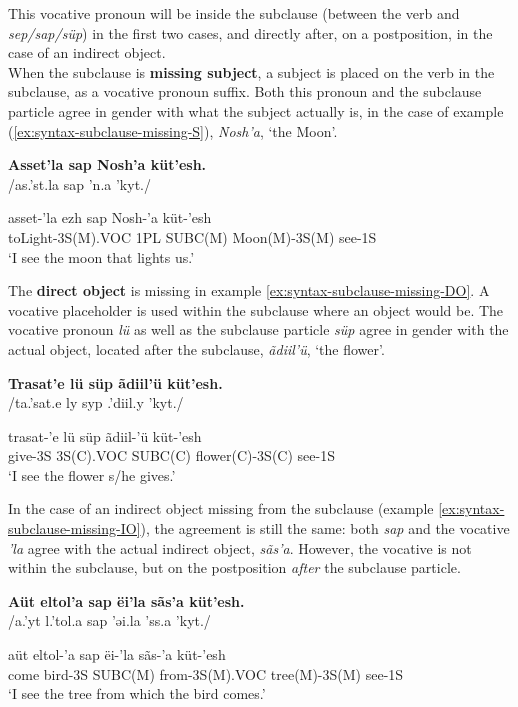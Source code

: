 This vocative pronoun will be inside the subclause (between the verb and \emph{sep/sap/süp}) in the first two cases, and directly after, on a postposition, in the case of an indirect object.\\

When the subclause is \textbf{missing subject}, a subject is placed on the verb in the subclause, as a vocative pronoun suffix.
Both this pronoun and the subclause particle agree in gender with what the subject actually is, in the case of example (\ref{ex:syntax-subclause-missing-S}),
\emph{Nosh’a}, ‘the Moon’.

\begin{exe}
\ex\label{ex:syntax-subclause-missing-S}
\textbf{Asset’la sap Nosh’a küt’esh.}\\
/as.'s{\ipaE}t.la sap 'n{\ipaO\ipaS}.a 'kyt.{\ipaE\ipaS}/

\gll asset-’la ezh sap Nosh-’a küt-’esh\\
toLight-3S(M).VOC 1PL SUBC(M) Moon(M)-3S(M) see-1S\\
\trans ‘I see the moon that lights us.’
\end{exe}

The \textbf{direct object} is missing in example \ref{ex:syntax-subclause-missing-DO}. A vocative placeholder is used within the subclause where an object
would be.
The vocative pronoun \emph{lü} as well as the subclause particle \emph{süp} agree in gender with the actual object, located after the subclause, \emph{ãdiil’ü}, ‘the flower’.

\begin{exe}
\ex\label{ex:syntax-subclause-missing-DO}
\textbf{Trasat’e lü süp ãdiil’ü küt’esh.}\\
/t{\ipaR}a.'sat.e ly syp {\ipaAT}.'diil.y 'kyt.{\ipaE\ipaS}/

\gll trasat-’e lü süp ãdiil-’ü küt-’esh\\
give-3S 3S(C).VOC SUBC(C) flower(C)-3S(C) see-1S\\
\trans ‘I see the flower s/he gives.’
\end{exe}

In the case of an indirect object missing from the subclause (example \ref{ex:syntax-subclause-missing-IO}), the agreement is still the same:
both \emph{sap} and the vocative \emph{’la} agree with the actual indirect object, \emph{sãs’a}.
However, the vocative is not within the subclause, but on the postposition \emph{after} the subclause particle.

\begin{exe}
\ex\label{ex:syntax-subclause-missing-IO}
\textbf{Aüt eltol’a sap ëi’la sãs’a küt’esh.}\\
/a.'yt {\ipaE}l.'tol.a sap 'əi.la 's{\ipaAT}s.a 'kyt.{\ipaE\ipaS}/

\gll aüt eltol-’a sap ëi-’la sãs-’a küt-’esh\\
come bird-3S SUBC(M) from-3S(M).VOC tree(M)-3S(M) see-1S\\
\trans ‘I see the tree from which the bird comes.’
\end{exe}

